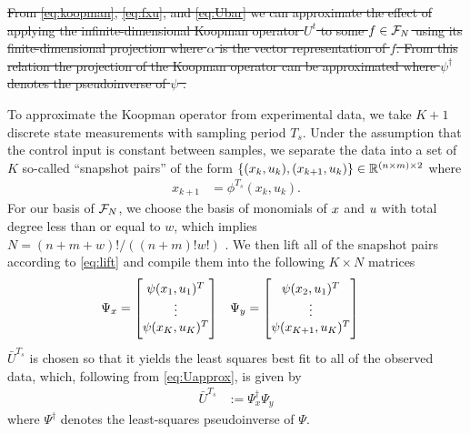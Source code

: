 \sout{
From \eqref{eq:koopman}, \eqref{eq:fxu}, and \eqref{eq:Ubar} we can approximate the effect of applying the infinite-dimensional Koopman operator $U^t$ to some $f \in \mathcal{F}_N$ using its finite-dimensional projection
where $\alpha$ is the vector representation of $f$.
From this relation the projection of the Koopman operator can be approximated
where ${\psi}^\dagger$ denotes the pseudoinverse of ${\psi}$ .
}


To approximate the Koopman operator from experimental data, we take $K+1$ discrete state measurements with sampling period $T_s$. Under the assumption that the control input is constant between samples, we separate the data into a set of $K$ so-called ``snapshot pairs'' of the form ${ \{(x_k,u_k),(x_{k+1},u_k)\} \in \mathbb{R}^{(n \times m) \times 2} }$ where
\begin{align}
    x_{k+1} &= \phi^{T_s} (x_k, u_k).
\end{align}
For our basis of $\mathcal{F}_N$, we choose the basis of monomials of $x$ and $u$ with total degree less than or equal to $w$, which implies $N=(n+m+w)!/\left((n+m)!w!\right)$ \cite{mauroy2016linear} . 
We then lift all of the snapshot pairs according to \eqref{eq:lift} and compile them into the following $K \times N$ matrices
\begin{align}
    &\Psi_x = \begin{bmatrix}  {\psi}(x_1, u_1)^T \\ \vdots \\  {\psi}(x_K, u_K)^T \end{bmatrix}
    &&\Psi_y = \begin{bmatrix}  {\psi}(x_2, u_1)^T \\ \vdots \\  {\psi}(x_{K+1}, u_{K})^T \end{bmatrix}
\end{align}
$\bar{U}^{T_s}$ is chosen so that it yields the least squares best fit to all of the observed data, which, following from \eqref{eq:Uapprox}, is given by 
\begin{align}
    \bar{U}^{T_s} &:= \Psi_x^\dagger \Psi_y
\end{align}
where ${\Psi}^\dagger$ denotes the least-squares pseudoinverse of ${\Psi}$.


